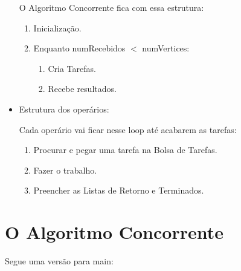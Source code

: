 \documentclass[12pt]{article}
\begin{document}
\begin{itemize}
		O Algoritmo Concorrente fica com essa estrutura:
		\begin{enumerate}
			\item Inicialização.
			\item Enquanto numRecebidos $<$ numVertices:
			\begin{enumerate}
				\item Cria Tarefas.
				\item Recebe resultados.
			\end{enumerate}
		\end{enumerate}

	\item Estrutura dos operários:

		Cada operário vai ficar nesse loop até acabarem as tarefas:
		\begin{enumerate}
			\item Procurar e pegar uma tarefa na Bolsa de Tarefas.
			\item Fazer o trabalho.
			\item Preencher as Listas de Retorno e Terminados.
		\end{enumerate}

\end{itemize}

\newpage
\section{O Algoritmo Concorrente}

Segue uma versão para main:
\end{document}
